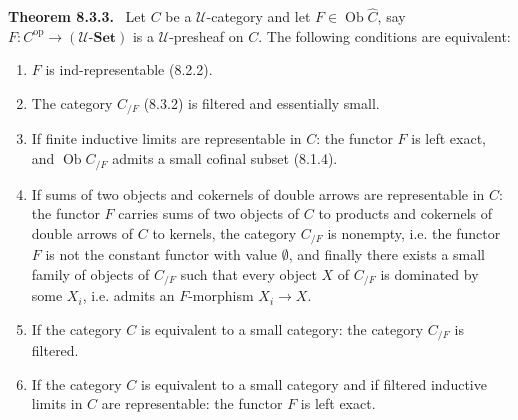 \documentclass[11pt]{article}
\newcommand{\U}{\mathcal{U}}
\newcommand{\Set}{\mathbf{Set}}
\newcommand{\Ob}{\operatorname{Ob}}
\newcommand{\op}{\mathrm{op}}
\newenvironment{statement}[1]{\par\medskip\noindent\textbf{#1.}\ }{\par\medskip}
\begin{document}
\begin{statement}{Theorem 8.3.3}
Let $C$ be a $\U$-category and let $F\in\Ob\widehat C$, say $F:C^{\op}\to(\U\text{-}\Set)$ is a $\U$-presheaf on $C$. The following conditions are equivalent:
\begin{enumerate}[label=(\roman*)]
\item $F$ is ind-representable (8.2.2).
\item The category $C_{/F}$ (8.3.2) is filtered and essentially small.
\item If finite inductive limits are representable in $C$: the functor $F$ is left exact, and $\Ob C_{/F}$ admits a small cofinal subset (8.1.4).
\item[(iii bis)] If sums of two objects and cokernels of double arrows are representable in $C$: the functor $F$ carries sums of two objects of $C$ to products and cokernels of double arrows of $C$ to kernels, the category $C_{/F}$ is nonempty, i.e. the functor $F$ is not the constant functor with value $\emptyset$, and finally there exists a small family of objects of $C_{/F}$ such that every object $X$ of $C_{/F}$ is dominated by some $X_i$, i.e. admits an $F$-morphism $X_i\to X$.
\item If the category $C$ is equivalent to a small category: the category $C_{/F}$ is filtered.
\item If the category $C$ is equivalent to a small category and if filtered inductive limits in $C$ are representable: the functor $F$ is left exact.
\end{enumerate}
\end{statement}
\end{document}
